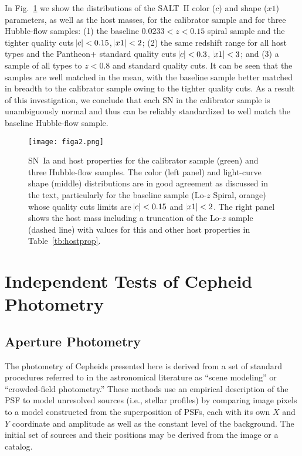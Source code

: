 \documentclass[12pt]{aastex631}
\begin{document}
\begin{appendices}
In Fig.~\ref{fg:snsamp} we show the distributions of the SALT~II color ($c$) and shape ($x1$) parameters, as well as the host masses, for the calibrator sample and for three Hubble-flow samples: (1) the baseline $0.0233 < z < 0.15$ spiral sample and the tighter quality cuts $\abs{c}<0.15$, $\abs{x1}<2$; (2) the same redshift range for all host types and the Pantheon+ standard quality cuts $\abs{c}<0.3$, $\abs{x1}<3$; and (3) a sample of all types to $z<0.8$ and standard quality cuts.  It can be seen that the samples are well matched in the mean, with the baseline sample better matched in breadth to the calibrator sample owing to the tighter quality cuts. As a result of this investigation, we conclude that each SN in the calibrator sample is unambiguously normal and thus can be reliably standardized to well match the baseline Hubble-flow sample.  

\begin{figure}[h]   
\begin{center}
\texttt{[image: figa2.png]}
\end{center}
\caption{\label{fg:snsamp} SN~Ia and host properties for the calibrator sample (green) and three Hubble-flow samples.  The color (left panel) and light-curve shape (middle) distributions are in good agreement as discussed in the text, particularly for the baseline sample (Lo-$z$ Spiral, orange) whose quality cuts limits are $\abs{c} < 0.15$ and $\abs{x1} < 2$.  The right panel shows the host mass including a truncation of the Lo-$z$ sample (dashed line) with values for this and other host properties in Table~\ref{tb:hostprop}.}
\end{figure}

\section{Independent Tests of Cepheid Photometry\label{sc:appb}}
\subsection{Aperture Photometry}

The photometry of Cepheids presented here is derived from a set of standard procedures referred to in the astronomical literature as ``scene modeling'' or ``crowded-field photometry.''  These methods use an empirical description of the PSF to model unresolved sources (i.e., stellar profiles) by comparing image pixels to a model constructed from the superposition of PSFs, each with its own $X$ and $Y$ coordinate and amplitude as well as the constant level of the background.  The initial set of sources and their positions may be derived from the image or a catalog.  


\end{appendices}
\end{document}
